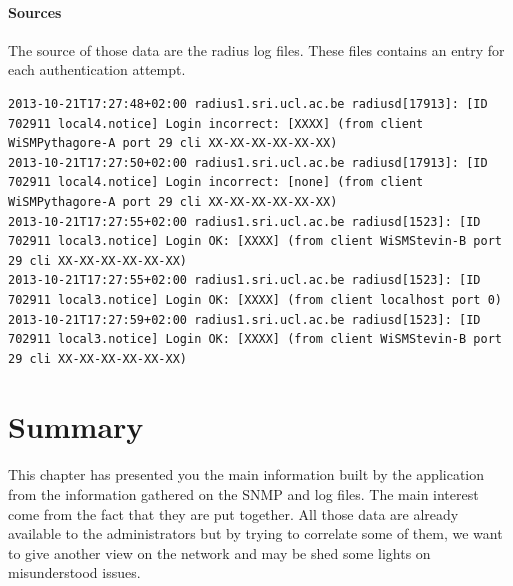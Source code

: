 \paragraph*{Sources} The source of those data are the radius log files. These files contains an entry for each authentication attempt.

\begin{lstlisting}[frame=single,breaklines=true,caption={Radius logs}]
2013-10-21T17:27:48+02:00 radius1.sri.ucl.ac.be radiusd[17913]: [ID 702911 local4.notice] Login incorrect: [XXXX] (from client WiSMPythagore-A port 29 cli XX-XX-XX-XX-XX-XX)
2013-10-21T17:27:50+02:00 radius1.sri.ucl.ac.be radiusd[17913]: [ID 702911 local4.notice] Login incorrect: [none] (from client WiSMPythagore-A port 29 cli XX-XX-XX-XX-XX-XX)
2013-10-21T17:27:55+02:00 radius1.sri.ucl.ac.be radiusd[1523]: [ID 702911 local3.notice] Login OK: [XXXX] (from client WiSMStevin-B port 29 cli XX-XX-XX-XX-XX-XX)
2013-10-21T17:27:55+02:00 radius1.sri.ucl.ac.be radiusd[1523]: [ID 702911 local3.notice] Login OK: [XXXX] (from client localhost port 0)
2013-10-21T17:27:59+02:00 radius1.sri.ucl.ac.be radiusd[1523]: [ID 702911 local3.notice] Login OK: [XXXX] (from client WiSMStevin-B port 29 cli XX-XX-XX-XX-XX-XX)
\end{lstlisting}

\section{Summary}
This chapter has presented you the main information built by the application from the information gathered on the SNMP and log files. The main interest come from the fact that they are put together. All those data are already available to the administrators but by trying to correlate some of them, we want to give another view on the network and may be shed some lights on misunderstood issues. 

